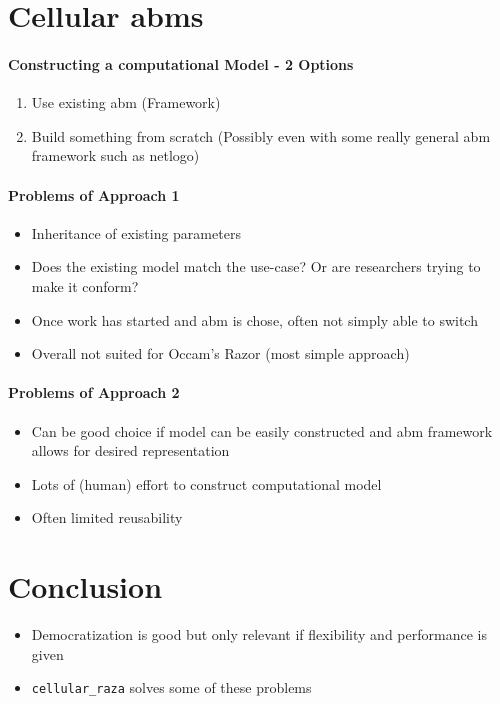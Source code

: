 \documentclass{article}
\begin{document}
\section{Cellular \aclp{abm}}

\paragraph{Constructing a computational Model - 2 Options}
\begin{enumerate}
    \item Use existing \ac{abm} (Framework)
    \item Build something from scratch (Possibly even with some really general \ac{abm}
        framework such as netlogo)
\end{enumerate}

\paragraph{Problems of Approach 1}
\begin{itemize}
    \item Inheritance of existing parameters
    \item Does the existing model match the use-case? Or are researchers trying to make it conform?
    \item Once work has started and \ac{abm} is chose, often not simply able to switch
    \item Overall not suited for Occam's Razor (most simple approach)
\end{itemize}

\paragraph{Problems of Approach 2}
\begin{itemize}
    \item Can be good choice if model can be easily constructed and \ac{abm} framework allows for
        desired representation
    \item Lots of (human) effort to construct computational model
    \item Often limited reusability
\end{itemize}

\section{Conclusion}
\begin{itemize}
    \item Democratization is good but only relevant if flexibility and performance is given \cite{Johnson2025}
    \item \cite{Pleyer2025} \texttt{cellular\_raza} solves some of these problems
\end{itemize}

\onecolumn


\end{document}
